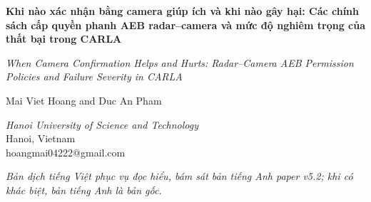 \documentclass[11pt,a4paper]{article}
\begin{document}
\begin{center}
{\LARGE\bfseries Khi nào xác nhận bằng camera giúp ích và khi nào gây hại: Các chính sách cấp quyền phanh AEB radar--camera và mức độ nghiêm trọng của thất bại trong CARLA\par}
\vspace{0.6em}
{\large\itshape When Camera Confirmation Helps and Hurts: Radar--Camera AEB Permission Policies and Failure Severity in CARLA\par}
\vspace{1.0em}
{\large Mai Viet Hoang and Duc An Pham\par}
\vspace{0.3em}
\textit{Hanoi University of Science and Technology}\\
Hanoi, Vietnam\\
hoangmai04222@gmail.com
\vspace{0.8em}

\textit{Bản dịch tiếng Việt phục vụ đọc hiểu, bám sát bản tiếng Anh paper v5.2; khi có khác biệt, bản tiếng Anh là bản gốc.}
\end{center}
\vspace{0.5em}
\end{document}
